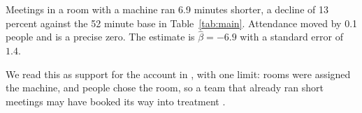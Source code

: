 \documentclass{article}
\begin{document}
Meetings in a room with a machine ran 6.9 minutes shorter, a decline of 13
percent against the 52 minute base in Table~\ref{tab:main}. Attendance moved by
0.1 people and is a precise zero. The estimate is
$\hat{\beta} = -6.9$ with a standard error of $1.4$.

We read this as support for the account in \citet{roe2019placeholder}, with one
limit: rooms were assigned the machine, and people chose the room, so a team
that already ran short meetings may have booked its way into treatment
\citep{smith2021fictitious}.



\end{document}
